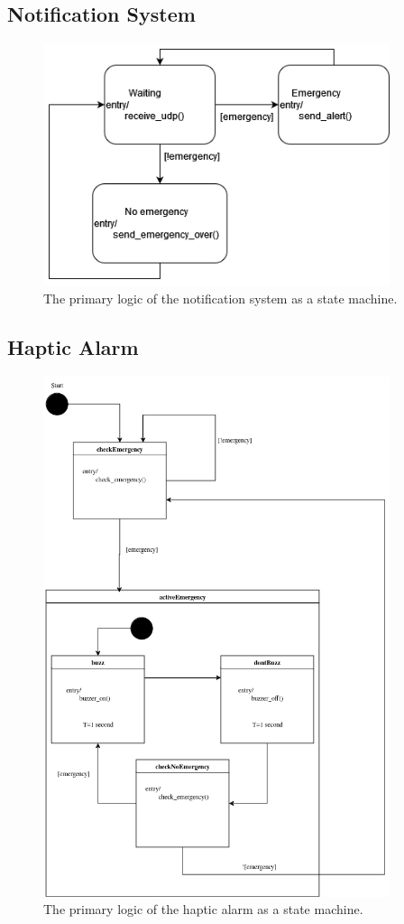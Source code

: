\subsection{Notification System}

\begin{figure}[H]
    \centering
    \includegraphics[width=4in]{../assets/state-machine/NotificationSystemStateMachine.png}
    \caption{The primary logic of the notification system as a state machine.}
\end{figure}

\subsection{Haptic Alarm}

\begin{figure}[H]
    \centering
    \includegraphics[width=4in]{../assets/state-machine/HapticAlarmStateMachine.png}
    \caption{The primary logic of the haptic alarm as a state machine.}
\end{figure}

